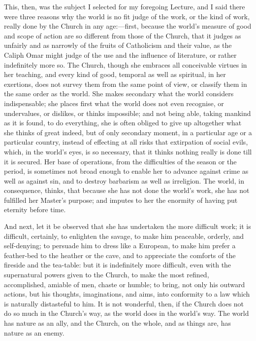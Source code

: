 This, then, was the subject I selected for my foregoing Lecture,
and I said there were three reasons why the world is no fit judge of
the work, or the kind of work, really done by the Church in any age:—first, because the world's measure of good and scope of action
are so different from those of the Church, that it judges as unfairly
and as narrowly of the fruits of Catholicism and their value, as the
Caliph Omar might judge of the use and the influence of literature, or
rather indefinitely more so. The Church, though she embraces all
conceivable virtues in her teaching, and every kind of good, temporal
as well as spiritual, in her exertions, does not survey them from the
same point of view, or classify them in the same order as the world.
She makes secondary what the world considers indispensable; she places
first what the world does not even recognise, or undervalues, or
dislikes, or thinks impossible; and not being able, taking mankind as
it is found, to do everything, she is often obliged to give up
altogether what she thinks of great indeed, but of only secondary
moment, in a particular age or a particular country, instead of
effecting at all risks that extirpation of social evils, which, in the
world's eyes, is so necessary, that it thinks nothing really is done
till it is secured. Her base of operations, from the difficulties of
the season or the period, is sometimes not broad enough to enable her
to advance against crime as well as against sin, and to destroy
barbarism as well as irreligion. The world, in consequence, thinks,
that because she has not done the world's work, she has not fulfilled
her Master's purpose; and imputes to her the enormity of having put
eternity before time.

And next, let it be observed that she has undertaken the more
difficult work; it is difficult, certainly, to enlighten the savage,
to make him peaceable, orderly, and self-denying; to persuade him to
dress like a European, to make him prefer a feather-bed to the heather
or the cave, and to appreciate the comforts of the fireside and the
tea-table: but it is indefinitely more difficult, even with the
supernatural powers given to the Church, to make the most refined,
accomplished, amiable of men, chaste or humble; to bring, not only his
outward actions, but his thoughts, imaginations, and aims, into
conformity to a law which is naturally distasteful to him. It is not
wonderful, then, if the Church does not do so much in the Church's
way, as the world does in the world's way. The world has nature as an
ally, and the Church, on the whole, and as things are, has nature as
an enemy.

